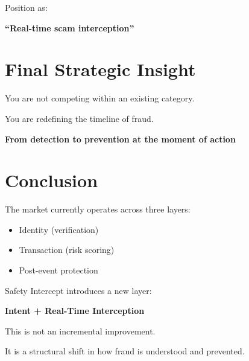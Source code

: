 \documentclass[11pt]{article}
\begin{document}
Position as:
\begin{center}
\textbf{``Real-time scam interception''}
\end{center}

\section{Final Strategic Insight}

You are not competing within an existing category.

You are redefining the timeline of fraud.

\begin{center}
\textbf{From detection to prevention at the moment of action}
\end{center}

\section{Conclusion}

The market currently operates across three layers:
\begin{itemize}
    \item Identity (verification)
    \item Transaction (risk scoring)
    \item Post-event protection
\end{itemize}

Safety Intercept introduces a new layer:
\begin{center}
\textbf{Intent + Real-Time Interception}
\end{center}

This is not an incremental improvement.

It is a structural shift in how fraud is understood and prevented.
\end{document}
